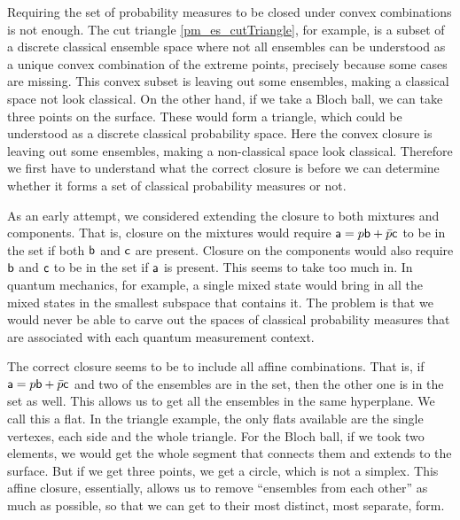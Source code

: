 Requiring the set of probability measures to be closed under convex combinations is not enough. The cut triangle \ref{pm_es_cutTriangle}, for example, is a subset of a discrete classical ensemble space where not all ensembles can be understood as a unique convex combination of the extreme points, precisely because some cases are missing. This convex subset is leaving out some ensembles, making a classical space not look classical. On the other hand, if we take a Bloch ball, we can take three points on the surface. These would form a triangle, which could be understood as a discrete classical probability space. Here the convex closure is leaving out some ensembles, making a non-classical space look classical. Therefore we first have to understand what the correct closure is before we can determine whether it forms a set of classical probability measures or not.

As an early attempt, we considered extending the closure to both mixtures and components. That is, closure on the mixtures would require $\ens[a] = p \ens[b] + \bar{p} \ens[c]$ to be in the set if both $\ens[b]$ and $\ens[c]$ are present. Closure on the components would also require $\ens[b]$ and $\ens[c]$ to be in the set if $\ens[a]$ is present. This seems to take too much in. In quantum mechanics, for example, a single mixed state would bring in all the mixed states in the smallest subspace that contains it. The problem is that we would never be able to carve out the spaces of classical probability measures that are associated with each quantum measurement context.

The correct closure seems to be to include all affine combinations. That is, if $\ens[a] = p \ens[b] + \bar{p} \ens[c]$ and two of the ensembles are in the set, then the other one is in the set as well. This allows us to get all the ensembles in the same hyperplane. We call this a flat. In the triangle example, the only flats available are the single vertexes, each side and the whole triangle. For the Bloch ball, if we took two elements, we would get the whole segment that connects them and extends to the surface. But if we get three points, we get a circle, which is not a simplex. This affine closure, essentially, allows us to remove ``ensembles from each other'' as much as possible, so that we can get to their most distinct, most separate, form.



